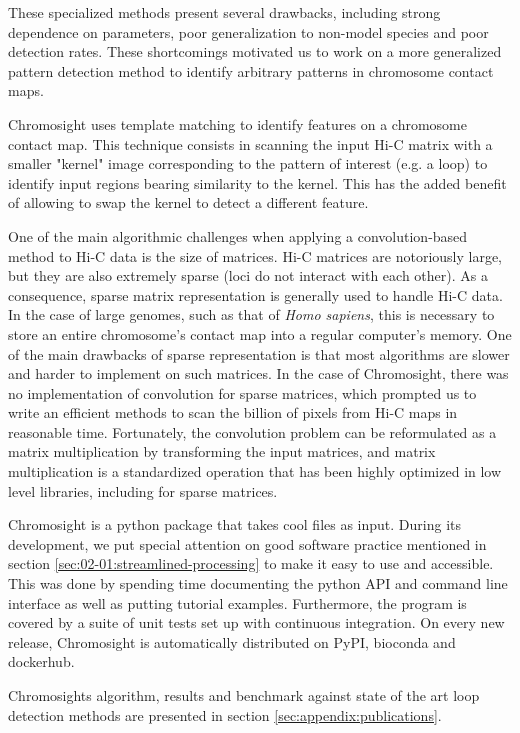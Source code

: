 These specialized methods present several drawbacks, including strong dependence on parameters, poor generalization to non-model species and poor detection rates. These shortcomings motivated us to work on a more generalized pattern detection method to identify arbitrary patterns in chromosome contact maps.

Chromosight uses template matching to identify features on a chromosome contact map. This technique consists in scanning the input Hi-C matrix with a smaller "kernel" image corresponding to the pattern of interest (e.g. a loop) to identify input regions bearing similarity to the kernel. This has the added benefit of allowing to swap the kernel to detect a different feature.

One of the main algorithmic challenges when applying a convolution-based method to Hi-C data is the size of matrices. Hi-C matrices are notoriously large, but they are also extremely sparse (loci do not interact with each other). As a consequence, sparse matrix representation is generally used to handle Hi-C data. In the case of large genomes, such as that of \textit{Homo sapiens}, this is necessary to store an entire chromosome's contact map into a regular computer's memory. One of the main drawbacks of sparse representation is that most algorithms are slower and harder to implement on such matrices. In the case of Chromosight, there was no implementation of convolution for sparse matrices, which prompted us to write an efficient methods to scan the billion of pixels from Hi-C maps in reasonable time. Fortunately, the convolution problem can be reformulated as a matrix multiplication by transforming the input matrices, and matrix multiplication is a standardized operation that has been highly optimized in low level libraries, including for sparse matrices.

Chromosight is a python package that takes cool files as input. During its development, we put special attention on good software practice mentioned in section \ref{sec:02-01:streamlined-processing} to make it easy to use and accessible. This was done by spending time documenting the python API and command line interface as well as putting tutorial examples. Furthermore, the program is covered by a suite of unit tests set up with continuous integration. On every new release, Chromosight is automatically distributed on PyPI, bioconda and dockerhub.

Chromosights algorithm, results and benchmark against state of the art loop detection methods are presented in section \ref{sec:appendix:publications}.

